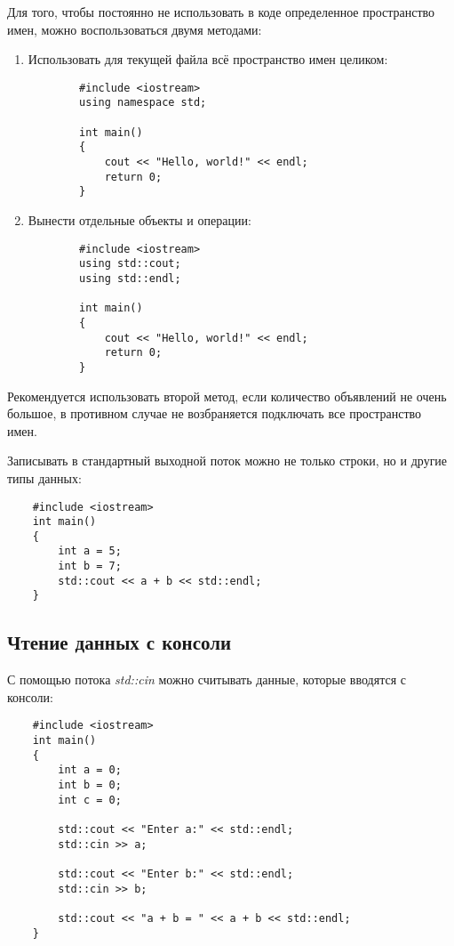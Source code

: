 Для того, чтобы постоянно не использовать в коде определенное пространство имен, можно воспользоваться двумя методами:
\begin{enumerate}
    \item Использовать для текущей файла всё пространство имен целиком:
    \begin{lstlisting}
        #include <iostream>
        using namespace std;

        int main()
        {
            cout << "Hello, world!" << endl;
            return 0;
        }
    \end{lstlisting}

    \item Вынести отдельные объекты и операции:
    \begin{lstlisting}
        #include <iostream>
        using std::cout;
        using std::endl;

        int main()
        {
            cout << "Hello, world!" << endl;
            return 0;
        }
    \end{lstlisting}
\end{enumerate}

Рекомендуется использовать второй метод, если количество объявлений не очень большое, в противном случае не возбраняется подключать все пространство имен.

Записывать в стандартный выходной поток можно не только строки, но и другие типы данных:

\begin{lstlisting}
    #include <iostream>
    int main()
    {
        int a = 5;
        int b = 7;
        std::cout << a + b << std::endl;
    }
\end{lstlisting}

\subsection{Чтение данных с консоли}

С помощью потока \textit{std::cin} можно считывать данные, которые вводятся с консоли:
\begin{lstlisting}
    #include <iostream>
    int main()
    {
        int a = 0;
        int b = 0;
        int c = 0;
        
        std::cout << "Enter a:" << std::endl;
        std::cin >> a;
        
        std::cout << "Enter b:" << std::endl;
        std::cin >> b;
        
        std::cout << "a + b = " << a + b << std::endl; 
    }
\end{lstlisting}

